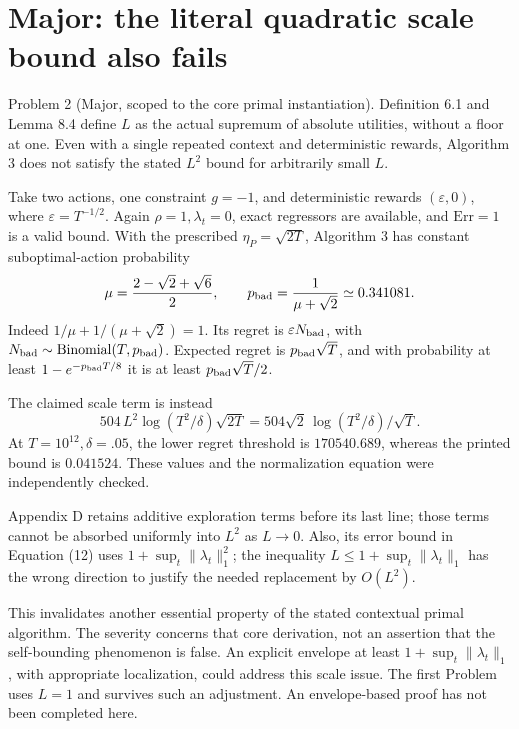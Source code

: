 \documentclass[10pt]{article}
\begin{document}
\section*{Major: the literal quadratic scale bound also fails}
Problem 2 (Major, scoped to the core primal instantiation).  Definition 6.1 and Lemma 8.4 define \(L\) as the actual supremum of absolute utilities, without a floor at one. Even with a single repeated context and deterministic rewards, Algorithm 3 does not satisfy the stated \(L^2\) bound for arbitrarily small \(L\).\par
Take two actions, one constraint \(g=-1\), and deterministic rewards \((\varepsilon,0)\), where \(\varepsilon=T^{-1/2}\). Again \(\rho=1,\lambda_t=0\), exact regressors are available, and \(\mathrm{Err}=1\) is a valid bound. With the prescribed \(\eta_P=\sqrt{2T}\), Algorithm 3 has constant suboptimal-action probability \[\mu=\frac{2-\sqrt2+\sqrt6}{2},\qquad
 p_{\rm bad}=\frac1{\mu+\sqrt2}\simeq0.341081.\] Indeed \(1/\mu+1/(\mu+\sqrt2)=1\). Its regret is \(\varepsilon N_{\rm bad}\), with \(N_{\rm bad}\sim\operatorname{Binomial}(T,p_{\rm bad})\). Expected regret is \(p_{\rm bad}\sqrt T\), and with probability at least \(1-e^{-p_{\rm bad}T/8}\) it is at least \(p_{\rm bad}\sqrt T/2\).\par
The claimed scale term is instead \[504\,L^2\log(T^2/\delta)\sqrt{2T}
 =504\sqrt2\,\log(T^2/\delta)/\sqrt T.\] At \(T=10^{12},\delta=.05\), the lower regret threshold is \(170540.689\), whereas the printed bound is \(0.041524\). These values and the normalization equation were independently checked.\par
Appendix D retains additive exploration terms before its last line; those terms cannot be absorbed uniformly into \(L^2\) as \(L\to0\). Also, its error bound in Equation (12) uses \(1+\sup_t\|\lambda_t\|_1^2\); the inequality \(L\le1+\sup_t\|\lambda_t\|_1\) has the wrong direction to justify the needed replacement by \(O(L^2)\).\par
This invalidates another essential property of the stated contextual primal algorithm. The severity concerns that core derivation, not an assertion that the self-bounding phenomenon is false. An explicit envelope at least \(1+\sup_t\|\lambda_t\|_1\), with appropriate localization, could address this scale issue. The first Problem uses \(L=1\) and survives such an adjustment. An envelope-based proof has not been completed here.\par
\end{document}
